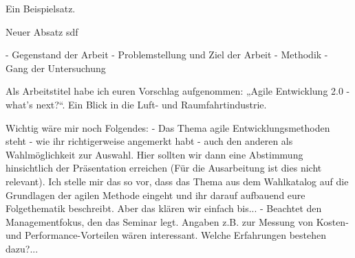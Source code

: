 Ein Beispielsatz. \parencite[Vgl.][S. 20]{Thompson:1984:RTT:358198.358210}

Neuer Absatz sdf

- Gegenstand der Arbeit
- Problemstellung und Ziel der Arbeit 
- Methodik
- Gang der Untersuchung

Als Arbeitstitel habe ich euren Vorschlag aufgenommen: „Agile Entwicklung 2.0 - what's next?“. Ein Blick in die Luft- und Raumfahrtindustrie.

Wichtig wäre mir noch Folgendes: 
- Das Thema agile Entwicklungsmethoden steht - wie ihr richtigerweise angemerkt habt - auch den anderen als Wahlmöglichkeit zur Auswahl. Hier sollten wir dann eine Abstimmung hinsichtlich der Präsentation erreichen (Für die Ausarbeitung ist dies nicht relevant). Ich stelle mir das so vor, dass das Thema aus dem Wahlkatalog auf die Grundlagen der agilen Methode eingeht und ihr darauf aufbauend eure Folgethematik beschreibt. Aber das klären wir einfach bis...
- Beachtet den Managementfokus, den das Seminar legt. Angaben z.B. zur Messung von Kosten- und Performance-Vorteilen wären interessant. Welche Erfahrungen bestehen dazu?...